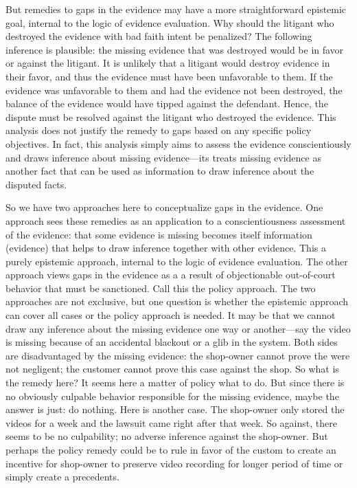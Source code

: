 \documentclass[
  10pt,
  dvipsnames,enabledeprecatedfontcommands]{scrartcl}
\begin{document}
But remedies to gaps in the evidence may have a more straightforward
epistemic goal, internal to the logic of evidence evaluation. Why should
the litigant who destroyed the evidence with bad faith intent be
penalized? The following inference is plausible: the missing evidence
that was destroyed would be in favor or against the litigant. It is
unlikely that a litigant would destroy evidence in their favor, and thus
the evidence must have been unfavorable to them. If the evidence was
unfavorable to them and had the evidence not been destroyed, the balance
of the evidence would have tipped against the defendant. Hence, the
dispute must be resolved against the litigant who destroyed the
evidence. This analysis does not justify the remedy to gaps based on any
specific policy objectives. In fact, this analysis simply aims to assess
the evidence conscientiously and draws inference about missing
evidence---its treats missing evidence as another fact that can be used
as information to draw inference about the disputed facts.

So we have two approaches here to conceptualize gaps in the evidence.
One approach sees these remedies as an application to a
conscientiousness assessment of the evidence: that some evidence is
missing becomes itself information (evidence) that helps to draw
inference together with other evidence. This a purely epistemic
approach, internal to the logic of evidence evaluation. The other
approach views gaps in the evidence as a a result of objectionable
out-of-court behavior that must be sanctioned. Call this the policy
approach. The two approaches are not exclusive, but one question is
whether the epistemic approach can cover all cases or the policy
approach is needed. It may be that we cannot draw any inference about
the missing evidence one way or another---say the video is missing
because of an accidental blackout or a glib in the system. Both sides
are disadvantaged by the missing evidence: the shop-owner cannot prove
the were not negligent; the customer cannot prove this case against the
shop. So what is the remedy here? It seems here a matter of policy what
to do. But since there is no obviously culpable behavior responsible for
the missing evidence, maybe the answer is just: do nothing. Here is
another case. The shop-owner only stored the videos for a week and the
lawsuit came right after that week. So against, there seems to be no
culpability; no adverse inference against the shop-owner. But perhaps
the policy remedy could be to rule in favor of the custom to create an
incentive for shop-owner to preserve video recording for longer period
of time or simply create a precedents.
\end{document}
